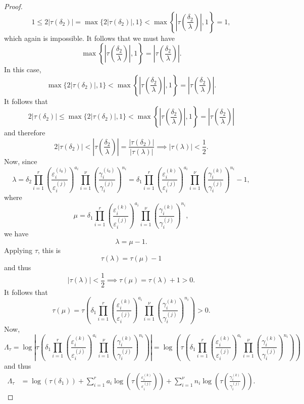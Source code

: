 \begin{proof}
\[1 \leq 2|\tau(\delta_2)| = \max\{2|\tau(\delta_2)|,1\} < \max \left\{ \left|\tau\left(\frac{\delta_2}{\lambda}\right)\right|, 1\right\} = 1,\]
which again is impossible. It follows that we must have
\[\max \left\{ \left|\tau\left(\frac{\delta_2}{\lambda}\right)\right|, 1\right\} = \left|\tau\left(\frac{\delta_2}{\lambda}\right)\right|.\]
In this case, 
\[\max\{2|\tau(\delta_2)|,1\} < \max \left\{ \left|\tau\left(\frac{\delta_2}{\lambda}\right)\right|, 1\right\} = \left|\tau\left(\frac{\delta_2}{\lambda}\right)\right|.\]
It follows that
\[2|\tau(\delta_2)| \leq \max\{2|\tau(\delta_2)|,1\} < \max \left\{ \left|\tau\left(\frac{\delta_2}{\lambda}\right)\right|, 1\right\} = \left|\tau\left(\frac{\delta_2}{\lambda}\right)\right|\]
and therefore
\[2|\tau(\delta_2)| < \left|\tau\left(\frac{\delta_2}{\lambda}\right)\right| = \frac{|\tau(\delta_2)|}{|\tau(\lambda)|} \implies |\tau(\lambda)| < \frac{1}{2}.\]
Now, since
\[\lambda = \delta_2 \prod_{i = 1}^{r}\left( \frac{\varepsilon_i^{(i_0)}}{\varepsilon_i^{(j)}}\right)^{a_i} \prod_{i = 1}^{\nu} \left( \frac{\gamma_i^{(i_0)}}{\gamma_i^{(j)}}\right)^{n_i} = \delta_1 \prod_{i = 1}^r\left( \frac{\varepsilon_i^{(k)}}{\varepsilon_i^{(j)}}\right)^{a_i}\prod_{i = 1}^{\nu} \left( \frac{\gamma_i^{(k)}}{\gamma_i^{(j)}}\right)^{n_i} - 1,\]
where
\[\mu =  \delta_1 \prod_{i = 1}^r\left( \frac{\varepsilon_i^{(k)}}{\varepsilon_i^{(j)}}\right)^{a_i}\prod_{i = 1}^{\nu} \left( \frac{\gamma_i^{(k)}}{\gamma_i^{(j)}}\right)^{n_i},\]
we have
\[\lambda = \mu - 1.\]
Applying $\tau$, this is
\[\tau(\lambda) = \tau(\mu) -1\]
and thus
\[|\tau(\lambda)| < \frac{1}{2} \implies \tau(\mu) = \tau(\lambda) + 1 > 0.\]
It follows that
\[\tau(\mu) = \tau\left(\delta_1 \prod_{i = 1}^r\left( \frac{\varepsilon_i^{(k)}}{\varepsilon_i^{(j)}}\right)^{a_i}\prod_{i = 1}^{\nu} \left( \frac{\gamma_i^{(k)}}{\gamma_i^{(j)}}\right)^{n_i}\right) > 0.\]
Now, 
\[\Lambda_{\tau} = \log\left|\tau\left(\delta_1 \prod_{i = 1}^r\left( \frac{\varepsilon_i^{(k)}}{\varepsilon_i^{(j)}}\right)^{a_i}\prod_{i = 1}^{\nu} \left( \frac{\gamma_i^{(k)}}{\gamma_i^{(j)}}\right)^{n_i}\right)\right|= \log\left(\tau\left(\delta_1 \prod_{i = 1}^r\left( \frac{\varepsilon_i^{(k)}}{\varepsilon_i^{(j)}}\right)^{a_i}\prod_{i = 1}^{\nu} \left( \frac{\gamma_i^{(k)}}{\gamma_i^{(j)}}\right)^{n_i}\right)\right) \]
and thus
\begin{align*}
\Lambda_{\tau}	
	& = \log\left(\tau\left(\delta_1\right)\right) + \sum_{i=1}^r a_i\log\left(\tau\left( \frac{\varepsilon_i^{(k)}}{\varepsilon_i^{(j)}}\right) \right) + \sum_{i=1}^{\nu}n_i\log \left(\tau\left( \frac{\gamma_i^{(k)}}{\gamma_i^{(j)}}\right)\right).

\end{align*}
\end{proof}
